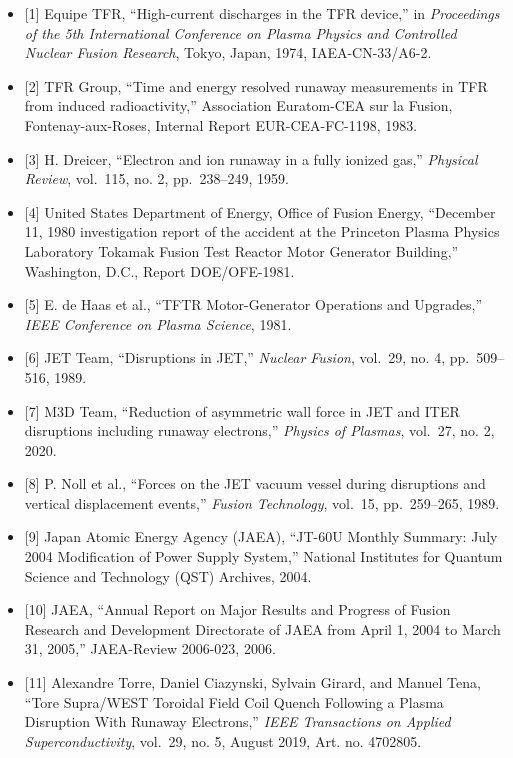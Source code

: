 \documentclass[11pt,a4paper]{article}
\begin{document}
\begin{itemize}
\item
  {[}1{]} Equipe TFR, ``High-current discharges in the TFR device,'' in \emph{Proceedings of the 5th International Conference on Plasma Physics and Controlled Nuclear Fusion Research}, Tokyo, Japan, 1974, IAEA-CN-33/A6-2.
\item
  {[}2{]} TFR Group, ``Time and energy resolved runaway measurements in TFR from induced radioactivity,'' Association Euratom-CEA sur la Fusion, Fontenay-aux-Roses, Internal Report EUR-CEA-FC-1198, 1983.
\item
  {[}3{]} H. Dreicer, ``Electron and ion runaway in a fully ionized gas,'' \emph{Physical Review}, vol.~115, no. 2, pp.~238--249, 1959.
\item
  {[}4{]} United States Department of Energy, Office of Fusion Energy, ``December 11, 1980 investigation report of the accident at the Princeton Plasma Physics Laboratory Tokamak Fusion Test Reactor Motor Generator Building,'' Washington, D.C., Report DOE/OFE-1981.
\item
  {[}5{]} E. de Haas et al., ``TFTR Motor-Generator Operations and Upgrades,'' \emph{IEEE Conference on Plasma Science}, 1981.
\item
  {[}6{]} JET Team, ``Disruptions in JET,'' \emph{Nuclear Fusion}, vol.~29, no. 4, pp.~509--516, 1989.
\item
  {[}7{]} M3D Team, ``Reduction of asymmetric wall force in JET and ITER disruptions including runaway electrons,'' \emph{Physics of Plasmas}, vol.~27, no. 2, 2020.
\item
  {[}8{]} P. Noll et al., ``Forces on the JET vacuum vessel during disruptions and vertical displacement events,'' \emph{Fusion Technology}, vol.~15, pp.~259--265, 1989.
\item
  {[}9{]} Japan Atomic Energy Agency (JAEA), ``JT-60U Monthly Summary: July 2004 Modification of Power Supply System,'' National Institutes for Quantum Science and Technology (QST) Archives, 2004.
\item
  {[}10{]} JAEA, ``Annual Report on Major Results and Progress of Fusion Research and Development Directorate of JAEA from April 1, 2004 to March 31, 2005,'' JAEA-Review 2006-023, 2006.
\item
  {[}11{]} Alexandre Torre, Daniel Ciazynski, Sylvain Girard, and Manuel Tena, ``Tore Supra/WEST Toroidal Field Coil Quench Following a Plasma Disruption With Runaway Electrons,'' \emph{IEEE Transactions on Applied Superconductivity}, vol.~29, no. 5, August 2019, Art. no. 4702805.

\end{itemize}
\end{document}
